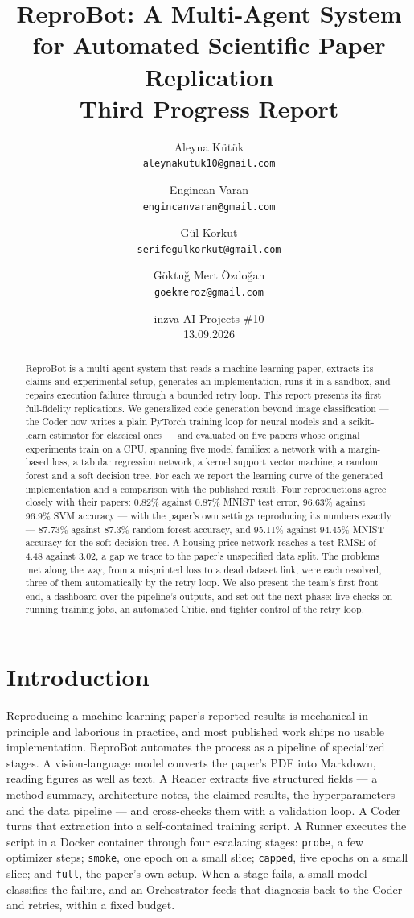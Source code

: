 \documentclass[10pt,twocolumn]{article}
\title{\textbf{ReproBot: A Multi-Agent System for Automated Scientific Paper Replication}\\[0.4em]
\large Third Progress Report}
\author{
  Aleyna Kütük \\ \small\texttt{aleynakutuk10@gmail.com}
  \and
  Engincan Varan \\ \small\texttt{engincanvaran@gmail.com}
  \and
  Gül Korkut \\ \small\texttt{serifegulkorkut@gmail.com}
  \and
  Göktuğ Mert Özdoğan \\ \small\texttt{goekmeroz@gmail.com}
}
\date{inzva AI Projects \#10 \\ 13.09.2026}
\begin{document}
\maketitle

\begin{abstract}
ReproBot is a multi-agent system that reads a machine learning paper, extracts its claims and
experimental setup, generates an implementation, runs it in a sandbox, and repairs execution
failures through a bounded retry loop. This report presents its first full-fidelity
replications. We generalized code generation beyond image classification --- the Coder now
writes a plain PyTorch training loop for neural models and a scikit-learn estimator for
classical ones --- and evaluated on five papers whose original experiments train on a CPU,
spanning five model families: a network with a margin-based loss, a tabular regression network,
a kernel support vector machine, a random forest and a soft decision tree. For each we report
the learning curve of the generated implementation and a comparison with the published result.
Four reproductions agree closely with their papers: 0.82\% against 0.87\% MNIST test error, 96.63\% against 96.9\% SVM accuracy --- with the paper's own settings reproducing its numbers exactly --- 87.73\% against 87.3\% random-forest accuracy, and 95.11\% against 94.45\% MNIST accuracy for the soft decision tree. A housing-price network reaches a test RMSE of 4.48 against 3.02, a gap we
trace to the paper's unspecified data split. The problems met along the way, from a misprinted
loss to a dead dataset link, were each resolved, three of them automatically by the retry loop.
We also present the team's first front end, a dashboard over the pipeline's outputs, and set out
the next phase: live checks on running training jobs, an automated Critic, and tighter control of
the retry loop.
\end{abstract}

\section{Introduction}
\label{sec:intro}

Reproducing a machine learning paper's reported results is mechanical in principle and
laborious in practice, and most published work ships no usable implementation. ReproBot
automates the process as a pipeline of specialized stages. A vision-language model converts
the paper's PDF into Markdown, reading figures as well as text. A Reader extracts five
structured fields --- a method summary, architecture notes, the claimed results, the
hyperparameters and the data pipeline --- and cross-checks them with a validation loop. A Coder
turns that extraction into a self-contained training script. A Runner executes the script in a
Docker container through four escalating stages: \texttt{probe}, a few optimizer steps;
\texttt{smoke}, one epoch on a small slice; \texttt{capped}, five epochs on a small slice; and
\texttt{full}, the paper's own setup. When a stage fails, a small model classifies the failure,
and an Orchestrator feeds that diagnosis back to the Coder and retries, within a fixed budget.
\end{document}
